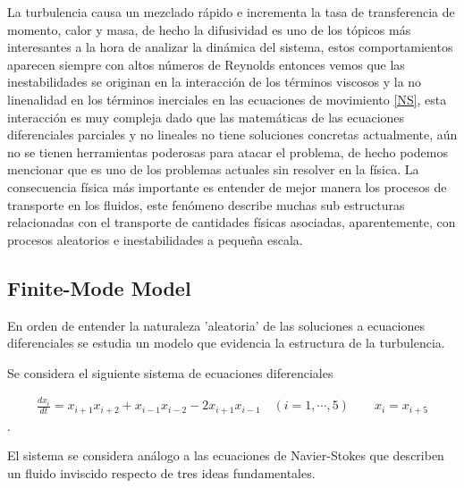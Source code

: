 \medskip

\noindent La turbulencia causa un mezclado rápido e incrementa la tasa de transferencia de momento, calor  y masa, de hecho la difusividad es uno de los tópicos más interesantes a la hora de analizar la dinámica del sistema, estos comportamientos aparecen siempre con altos números de Reynolds entonces vemos que las inestabilidades se originan en la interacción de los términos viscosos y la no linenalidad en los términos inerciales en las ecuaciones de movimiento \eqref{NS}, esta interacción es muy compleja dado que las matemáticas de las ecuaciones diferenciales parciales y no lineales no tiene soluciones concretas actualmente, aún no se tienen herramientas poderosas para atacar el problema, de hecho podemos mencionar que es uno de los problemas actuales sin resolver en la física. La consecuencia física más importante es entender de mejor manera los procesos de transporte en los fluidos, este fenómeno describe muchas sub estructuras relacionadas con el transporte de cantidades físicas asociadas, aparentemente, con procesos aleatorios e inestabilidades a pequeña escala. 


\subsection{Finite-Mode Model}

\noindent En orden de entender la naturaleza  'aleatoria' de las soluciones a ecuaciones diferenciales se estudia un modelo que evidencia la estructura de la turbulencia.

\medskip

\noindent Se considera el siguiente sistema de ecuaciones diferenciales

\begin{eqnarray}
\frac{dx_{i}}{dt} = x_{i+1}x_{i+2}+x_{i-1}x_{i-2}-2x_{i+1}x_{i-1}\quad (i =1,\cdots,5)\qquad x_{i} = x_{i+5}
\end{eqnarray}.

\noindent El sistema se considera análogo a las ecuaciones de Navier-Stokes que describen un fluido inviscido respecto de tres ideas fundamentales. 

